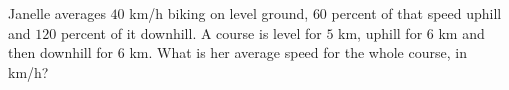 Janelle averages $40$ km/h biking on level ground, $60$ percent of that speed uphill and $120$ percent of it downhill. A course is level for $5$ km, uphill for $6$ km and then downhill for $6$ km. What is her average speed for the whole course, in km/h?
